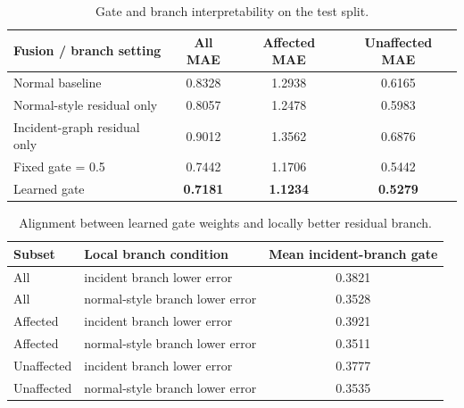 \begin{table}[t]
\centering
\caption{Gate and branch interpretability on the test split.}
\label{tab:gate_interpretability}
\scriptsize
\setlength{\tabcolsep}{4pt}
\begin{tabular}{lccc}
\toprule
Fusion / branch setting & All MAE & Affected MAE & Unaffected MAE \\
\midrule
Normal baseline & 0.8328 & 1.2938 & 0.6165 \\
Normal-style residual only & 0.8057 & 1.2478 & 0.5983 \\
Incident-graph residual only & 0.9012 & 1.3562 & 0.6876 \\
Fixed gate = 0.5 & 0.7442 & 1.1706 & 0.5442 \\
Learned gate & \textbf{0.7181} & \textbf{1.1234} & \textbf{0.5279} \\
\bottomrule
\end{tabular}
\end{table}

\begin{table}[t]
\centering
\caption{Alignment between learned gate weights and locally better residual branch.}
\label{tab:gate_selection_alignment}
\scriptsize
\setlength{\tabcolsep}{4pt}
\begin{tabular}{llc}
\toprule
Subset & Local branch condition & Mean incident-branch gate \\
\midrule
All & incident branch lower error & 0.3821 \\
All & normal-style branch lower error & 0.3528 \\
Affected & incident branch lower error & 0.3921 \\
Affected & normal-style branch lower error & 0.3511 \\
Unaffected & incident branch lower error & 0.3777 \\
Unaffected & normal-style branch lower error & 0.3535 \\
\bottomrule
\end{tabular}
\end{table}
